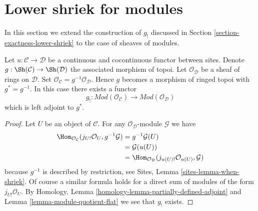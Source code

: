 \section{Lower shriek for modules}
\label{section-lower-shriek-modules}

\noindent
In this section we extend the construction of $g_!$ discussed
in Section \ref{section-exactness-lower-shriek} to the case of
sheaves of modules.

\begin{lemma}
\label{lemma-lower-shriek-modules}
Let $u : \mathcal{C} \to \mathcal{D}$ be a continuous and cocontinuous
functor between sites. Denote
$g : \Sh(\mathcal{C}) \to \Sh(\mathcal{D})$ the associated
morphism of topoi. Let $\mathcal{O}_\mathcal{D}$ be a sheaf of rings
on $\mathcal{D}$. Set
$\mathcal{O}_\mathcal{C} = g^{-1}\mathcal{O}_\mathcal{D}$.
Hence $g$ becomes a morphism of ringed topoi with $g^* = g^{-1}$.
In this case there exists a functor
$$
g_! :
\textit{Mod}(\mathcal{O}_\mathcal{C})
\longrightarrow
\textit{Mod}(\mathcal{O}_\mathcal{D})
$$
which is left adjoint to $g^*$.
\end{lemma}

\begin{proof}
Let $U$ be an object of $\mathcal{C}$. For any
$\mathcal{O}_\mathcal{D}$-module $\mathcal{G}$ we have
\begin{align*}
\Hom_{\mathcal{O}_\mathcal{C}}(j_{U!}\mathcal{O}_U, g^{-1}\mathcal{G})
& =
g^{-1}\mathcal{G}(U) \\
& =
\mathcal{G}(u(U)) \\
& =
\Hom_{\mathcal{O}_\mathcal{D}}(j_{u(U)!}\mathcal{O}_{u(U)}, \mathcal{G})
\end{align*}
because $g^{-1}$ is described by restriction, see
Sites, Lemma \ref{sites-lemma-when-shriek}.
Of course a similar formula holds for a direct sum of modules
of the form $j_{U!}\mathcal{O}_U$. By
Homology, Lemma \ref{homology-lemma-partially-defined-adjoint}
and
Lemma \ref{lemma-module-quotient-flat}
we see that $g_!$ exists.
\end{proof}


